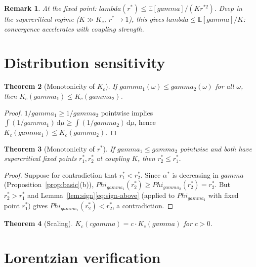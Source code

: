 \documentclass[11pt,a4paper]{article}
\let\Phi\relax\def\Phi{Phi}%
\let\lambda\relax\def\lambda{lambda}%
\let\gamma\relax\def\gamma{gamma}%
\newtheorem{theorem}{Theorem}[section]
\newtheorem{remark}[theorem]{Remark}
\theoremstyle{definition}
\begin{document}
\begin{remark}
At the fixed point: $\lambda(r^*) \leq \mathbb{E}[\gamma]/(Kr^{*2})$. Deep in the supercritical regime ($K \gg K_c$, $r^* \to 1$), this gives $\lambda \leq \mathbb{E}[\gamma]/K$: convergence accelerates with coupling strength.
\end{remark}

\section{Distribution sensitivity}\label{sec:sensitivity}

\begin{theorem}[Monotonicity of $K_c$]\label{thm:Kc-mono}
If $\gamma_1(\omega) \leq \gamma_2(\omega)$ for all $\omega$, then $K_c(\gamma_1) \leq K_c(\gamma_2)$.
\end{theorem}

\begin{proof}
$1/\gamma_1 \geq 1/\gamma_2$ pointwise implies $\int(1/\gamma_1)\,\mathrm{d}\mu \geq \int(1/\gamma_2)\,\mathrm{d}\mu$, hence $K_c(\gamma_1) \leq K_c(\gamma_2)$.
\end{proof}

\begin{theorem}[Monotonicity of $r^*$]\label{thm:rstar-mono}
If $\gamma_1 \leq \gamma_2$ pointwise and both have supercritical fixed points $r_1^*, r_2^*$ at coupling $K$, then $r_2^* \leq r_1^*$.
\end{theorem}

\begin{proof}
Suppose for contradiction that $r_1^* < r_2^*$. Since $\alpha^*$ is decreasing in $\gamma$ (Proposition~\ref{prop:basic}(b)), $\Phi_{\gamma_1}(r_2^*) \geq \Phi_{\gamma_2}(r_2^*) = r_2^*$. But $r_2^* > r_1^*$ and Lemma~\ref{lem:sign}\eqref{eq:sign-above} (applied to $\Phi_{\gamma_1}$ with fixed point $r_1^*$) gives $\Phi_{\gamma_1}(r_2^*) < r_2^*$, a contradiction.
\end{proof}

\begin{theorem}[Scaling]\label{thm:scaling}
$K_c(c\gamma) = c \cdot K_c(\gamma)$ for $c > 0$.
\end{theorem}

\section{Lorentzian verification}\label{sec:lorentzian}
\end{document}

